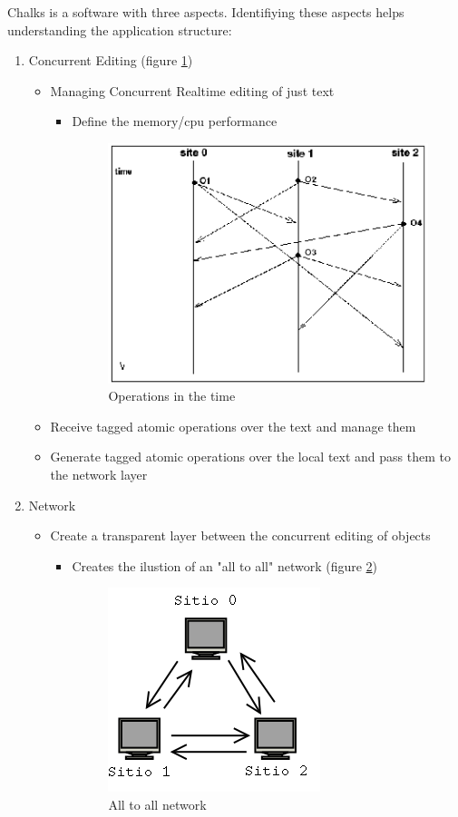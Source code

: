 \documentclass{report}
\begin{document}
Chalks is a software with three aspects. Identifiying these aspects helps understanding the application structure:

\begin{enumerate}

\item Concurrent Editing (figure \ref{fig:operationsintime})

  \begin{itemize} 
  \item Managing Concurrent Realtime editing of just text 
     \begin{itemize}
     \item Define the memory/cpu performance
           
\begin{figure}[htbp]
 \begin{center}
    \includegraphics[angle=0,width=0.3\linewidth]{schemas/operations_in_time.png}
 \end{center}
 \caption{Operations in the time}
 \label{fig:operationsintime}
\end{figure}

     \end{itemize}
     
  \item Receive tagged atomic operations over the text and manage them
  \item Generate tagged atomic operations over the local text and pass them to the network layer
  \end{itemize}
  
\item Network

  \begin{itemize}
  \item Create a transparent layer between the concurrent editing of objects
      \begin{itemize}
      \item Creates the ilustion of an "all to all" network (figure \ref{fig:alltoallnetwork})
      
\begin{figure}[htbp]
 \begin{center}
    \includegraphics[angle=0,width=0.3\linewidth]{schemas/all_to_all_network.png}
 \end{center}
 \caption{All to all network}
 \label{fig:alltoallnetwork}
\end{figure}
      

\end{itemize}
\end{itemize}
\end{enumerate}
\end{document}
